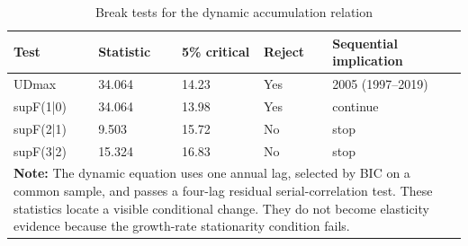 \begin{table}[h!]
\centering\small
\caption{Break tests for the dynamic accumulation relation}
\label{tab:dynamic-break}
\begin{tabular}{p{2.3cm}p{1.7cm}p{1.7cm}p{1.4cm}p{5.5cm}}
\toprule
\textbf{Test} & \textbf{Statistic} & \textbf{5\% critical} & \textbf{Reject} & \textbf{Sequential implication}\\
\midrule
UDmax & 34.064 & 14.23 & Yes & 2005 (1997--2019) \\
supF(1|0) & 34.064 & 13.98 & Yes & continue \\
supF(2|1) & 9.503 & 15.72 & No & stop \\
supF(3|2) & 15.324 & 16.83 & No & stop \\
\bottomrule
\multicolumn{5}{p{13.1cm}}{\footnotesize \textbf{Note:} The dynamic equation uses one annual lag, selected by BIC on a common sample, and passes a four-lag residual serial-correlation test. These statistics locate a visible conditional change. They do not become elasticity evidence because the growth-rate stationarity condition fails.}
\end{tabular}
\end{table}
